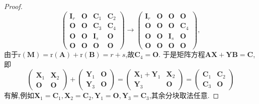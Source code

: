 \documentclass[lang=cn,newtx,10pt,scheme=chinese]{elegantbook}
\begin{document}
\begin{proof}
\[\begin{pmatrix}
        \boldsymbol{I}_r&\boldsymbol{O}&\boldsymbol{C}_1&\boldsymbol{C}_2\\
        \boldsymbol{O}&\boldsymbol{O}&\boldsymbol{C}_3&\boldsymbol{C}_4\\
        \boldsymbol{O}&\boldsymbol{O}&\boldsymbol{I}_s&\boldsymbol{O}\\
        \boldsymbol{O}&\boldsymbol{O}&\boldsymbol{O}&\boldsymbol{O}
        \end{pmatrix}\to\begin{pmatrix}
        \boldsymbol{I}_r&\boldsymbol{O}&\boldsymbol{O}&\boldsymbol{O}\\
        \boldsymbol{O}&\boldsymbol{O}&\boldsymbol{O}&\boldsymbol{C}_4\\
        \boldsymbol{O}&\boldsymbol{O}&\boldsymbol{I}_s&\boldsymbol{O}\\
        \boldsymbol{O}&\boldsymbol{O}&\boldsymbol{O}&\boldsymbol{O}
        \end{pmatrix},
        \]
        由于\(\mathrm{r}(\boldsymbol{M})=\mathrm{r}(\boldsymbol{A})+\mathrm{r}(\boldsymbol{B})=r + s\),故\(\boldsymbol{C}_4=\boldsymbol{O}\). 于是矩阵方程\(\boldsymbol{A}\boldsymbol{X}+\boldsymbol{Y}\boldsymbol{B}=\boldsymbol{C}\),即
        \[
        \begin{pmatrix}
        \boldsymbol{X}_1&\boldsymbol{X}_2\\
        \boldsymbol{O}&\boldsymbol{O}
        \end{pmatrix}+\begin{pmatrix}
        \boldsymbol{Y}_1&\boldsymbol{O}\\
        \boldsymbol{Y}_3&\boldsymbol{O}
        \end{pmatrix}=\begin{pmatrix}
        \boldsymbol{X}_1+\boldsymbol{Y}_1&\boldsymbol{X}_2\\
        \boldsymbol{Y}_3&\boldsymbol{O}
        \end{pmatrix}=\begin{pmatrix}
        \boldsymbol{C}_1&\boldsymbol{C}_2\\
        \boldsymbol{C}_3&\boldsymbol{O}
        \end{pmatrix}
        \]
        有解,例如\(\boldsymbol{X}_1=\boldsymbol{C}_1,\boldsymbol{X}_2=\boldsymbol{C}_2,\boldsymbol{Y}_1=\boldsymbol{O},\boldsymbol{Y}_3=\boldsymbol{C}_3\),其余分块取法任意.
\end{proof}
\end{document}
